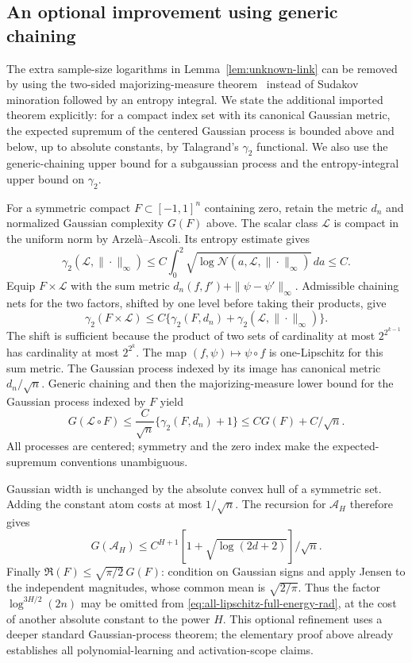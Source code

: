 \subsection{An optional improvement using generic chaining}
The extra sample-size logarithms in Lemma~\ref{lem:unknown-link} can be
removed by using the two-sided majorizing-measure theorem~\cite{talagrand} instead of
Sudakov minoration followed by an entropy integral. We state the
additional imported theorem explicitly: for a compact index set with
its canonical Gaussian metric, the expected supremum of the centered
Gaussian process is bounded above and below, up to absolute constants,
by Talagrand's $\gamma_2$ functional. We also use the generic-chaining
upper bound for a subgaussian process and the entropy-integral upper
bound on $\gamma_2$.

For a symmetric compact $F\subset[-1,1]^n$ containing zero, retain the
metric $d_n$ and normalized Gaussian complexity $G(F)$ above. The scalar
class $\mathcal L$ is compact in the uniform norm by Arzel\`a--Ascoli.
Its entropy estimate gives
\[
 \gamma_2(\mathcal L,\|\cdot\|_\infty)
 \le C\int_0^2\sqrt{\log\mathcal N(a,\mathcal L,\|\cdot\|_\infty)}\,da
 \le C.
\]
Equip $F\times\mathcal L$ with the sum metric
$d_n(f,f')+\|\psi-\psi'\|_\infty$. Admissible chaining nets for the two
factors, shifted by one level before taking their products, give
\[
 \gamma_2(F\times\mathcal L)
 \le C\{\gamma_2(F,d_n)+\gamma_2(\mathcal L,\|\cdot\|_\infty)\}.
\]
The shift is sufficient because the product of two sets of cardinality
at most $2^{2^{k-1}}$ has cardinality at most $2^{2^k}$.
The map $(f,\psi)\mapsto\psi\circ f$ is one-Lipschitz for this sum
metric. The Gaussian process indexed by its image has canonical metric
$d_n/\sqrt n$. Generic chaining and then the majorizing-measure lower
bound for the Gaussian process indexed by $F$ yield
\[
 G(\mathcal L\circ F)
 \le\frac C{\sqrt n}\{\gamma_2(F,d_n)+1\}
 \le C G(F)+C/\sqrt n.
\]
All processes are centered; symmetry and the zero index make the
expected-supremum conventions unambiguous.

Gaussian width is unchanged by the absolute convex hull of a symmetric
set. Adding the constant atom costs at most $1/\sqrt n$.
The recursion for $\mathcal A_H$ therefore gives
\[
 G(\mathcal A_H)
 \le C^{H+1}[1+\sqrt{\log(2d+2)}]/\sqrt n.
\]
Finally $\mathfrak R(F)\le\sqrt{\pi/2}\,G(F)$: condition on Gaussian
signs and apply Jensen to the independent magnitudes, whose common
mean is $\sqrt{2/\pi}$. Thus the factor
$\log^{3H/2}(2n)$ may be omitted from
\eqref{eq:all-lipschitz-full-energy-rad}, at the cost of another absolute
constant to the power $H$. This optional refinement uses a deeper
standard Gaussian-process theorem; the elementary proof above already
establishes all polynomial-learning and activation-scope claims.
